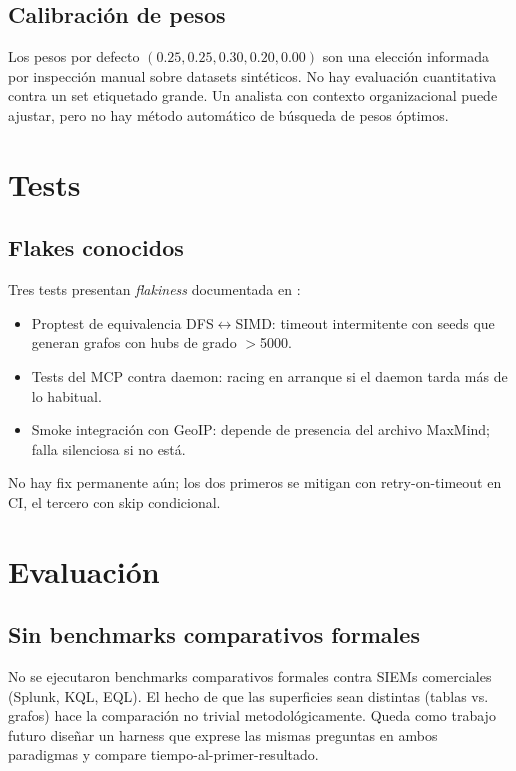 \subsection*{Calibración de pesos}

Los pesos por defecto
$(0.25, 0.25, 0.30, 0.20, 0.00)$ son una elección informada por
inspección manual sobre datasets sintéticos. No hay evaluación
cuantitativa contra un set etiquetado grande. Un analista con
contexto organizacional puede ajustar, pero no hay método
automático de búsqueda de pesos óptimos.

\section{Tests}

\subsection*{Flakes conocidos}

Tres tests presentan \emph{flakiness} documentada en
:

\begin{itemize}
    \item Proptest de equivalencia DFS$\leftrightarrow$SIMD: timeout
    intermitente con seeds que generan grafos con hubs de grado
    $>$5000.
    \item Tests del MCP contra daemon: racing en arranque si el
    daemon tarda más de lo habitual.
    \item Smoke integración con GeoIP: depende de presencia del
    archivo MaxMind; falla silenciosa si no está.
\end{itemize}

No hay fix perman\-ente aún; los dos primeros se mitigan con
retry-on-timeout en CI, el tercero con skip condicional.

\section{Evaluación}

\subsection*{Sin benchmarks comparativos formales}

No se ejecutaron benchmarks comparativos formales contra SIEMs
comerciales (Splunk, KQL, EQL). El hecho de que las superficies
sean distintas (tablas vs. grafos) hace la comparación no trivial
metodológicamente. Queda como trabajo futuro diseñar un harness
que exprese las mismas preguntas en ambos paradigmas y compare
tiempo-al-primer-resultado.

